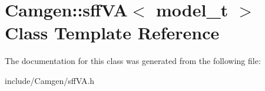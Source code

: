 \hypertarget{a00509}{}\section{Camgen\+:\+:sff\+V\+A$<$ model\+\_\+t $>$ Class Template Reference}
\label{a00509}


The documentation for this class was generated from the following file\+:\begin{DoxyCompactItemize}
\item 
include/\+Camgen/sff\+V\+A.\+h\end{DoxyCompactItemize}
